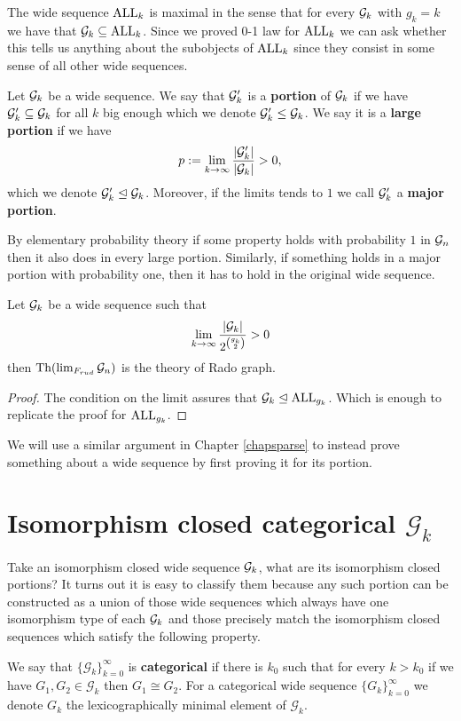 The wide sequence $\text{ALL}_k$ is maximal in the sense that for every $\mathcal{G}_k$ with $g_k=k$ we have that $\mathcal{G}_{k}\subseteq \text{ALL}_{k}$. Since we proved 0-1 law for $\text{ALL}_k$ we can ask whether this tells us anything about the subobjects of $\text{ALL}_k$ since they consist in some sense of all other wide sequences.

\begin{defi}\label{defiportion}
Let $\mathcal{G}_k$ be a wide sequence. We say that $\mathcal{G}_k'$ is a \textbf{portion} of $\mathcal{G}_k$ if we have $\mathcal{G}_k'\subseteq \mathcal{G}_k$ for all $k$ big enough which we denote $\mathcal{G}_k'\leq \mathcal{G}_k$. We say it is a \textbf{large portion} if we have
\[p:=\lim_{k\to\infty}\frac{\left|{\mathcal{G}_k'}\right|}{\left|{\mathcal{G}_k}\right|}>0,\]
which we denote $\mathcal{G}_k' \trianglelefteq \mathcal{G}_k$. Moreover, if the limits tends to $1$ we call $\mathcal{G}_k'$ a \textbf{major portion}.
\end{defi}

By elementary probability theory if some property holds with probability $1$ in $\mathcal{G}_n$ then it also does in every large portion. Similarly, if something holds in a major portion with probability one, then it has to hold in the original wide sequence.

\begin{crll}\label{crlltoobig}
Let $\mathcal{G}_k$ be a wide sequence such that 
\[\lim_{k\to\infty}\frac{\left|{\mathcal{G}_k}\right|}{2^{\binom{g_k}{2}}}>0\] then $\text{Th}(\lim_{F_{rud}}\mathcal{G}_n)$ is the theory of Rado graph.
\end{crll}
\begin{proof}
The condition on the limit assures that $\mathcal{G}_k\trianglelefteq \text{ALL}_{g_k}$. Which is enough to replicate the proof for $\text{ALL}_{g_k}$.
\end{proof}

We will use a similar argument in Chapter \ref{chapsparse} to instead prove something about a wide sequence by first proving it for its portion.

\section{Isomorphism closed categorical $\mathcal{G}_k$}

Take an isomorphism closed wide sequence $\mathcal{G}_k$, what are its isomorphism closed portions? It turns out it is easy to classify them because any such portion can be constructed as a union of those wide sequences which always have one isomorphism type of each $\mathcal{G}_k$ and those precisely match the isomorphism closed sequences which satisfy the following property.

\begin{defi}\label{lemmisocat}
We say that $\{\mathcal{G}_k\}_{k=0}^\infty$ is \textbf{categorical} if there is $k_0$ such that for every $k>k_0$ if we have $G_1,G_2\in\mathcal{G}_k$ then $G_1\cong G_2$. For a categorical wide sequence $\{G_k\}_{k=0}^\infty$ we denote $G_k$ the lexicographically minimal element of $\mathcal{G}_k$.
\end{defi}


